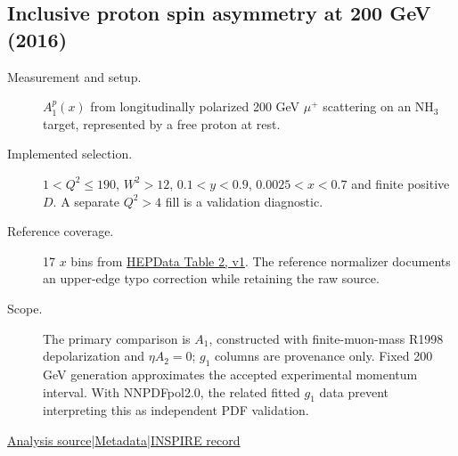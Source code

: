 \documentclass[11pt,a4paper]{article}
\newcommand{\id}[1]{{\small\texttt{\detokenize{#1}}}}
\begin{document}
\subsection{\texorpdfstring{Inclusive proton spin asymmetry at 200 GeV (2016)}{Inclusive proton spin asymmetry at 200 GeV (2016)}}
\id{COMPASS_2016_I1357198}\quad\cite{r1357198}
\begin{description}
\item[Measurement and setup.] $A_1^p(x)$ from longitudinally polarized 200 GeV $\mu^+$ scattering on an NH$_3$ target, represented by a free proton at rest.
\item[Implemented selection.] $1<Q^2\le190$, $W^2>12$, $0.1<y<0.9$, $0.0025<x<0.7$ and finite positive $D$. A separate $Q^2>4$ fill is a validation diagnostic.
\item[Reference coverage.] 17 $x$ bins from \href{https://doi.org/10.17182/hepdata.72819.v1/t2}{HEPData Table 2, v1}. The reference normalizer documents an upper-edge typo correction while retaining the raw source.
\item[Scope.] The primary comparison is $A_1$, constructed with finite-muon-mass R1998 depolarization and $\eta A_2=0$; $g_1$ columns are provenance only. Fixed 200 GeV generation approximates the accepted experimental momentum interval. With NNPDFpol2.0, the related fitted $g_1$ data prevent interpreting this as independent PDF validation.
\end{description}
{\small\href{https://github.com/apapaefs/HerwigPolarizedPheno/blob/105045bd757aaa6b217e87811dc5f9a22a8d1cef/analyses/rivet/dis/COMPASS_2016_I1357198.cc}{Analysis source}\quad|\quad\href{https://github.com/apapaefs/HerwigPolarizedPheno/blob/105045bd757aaa6b217e87811dc5f9a22a8d1cef/analyses/rivet/dis/COMPASS_2016_I1357198.info}{Metadata}\quad|\quad\href{https://inspirehep.net/literature/1357198}{INSPIRE record}}

\clearpage
{}
\end{document}
